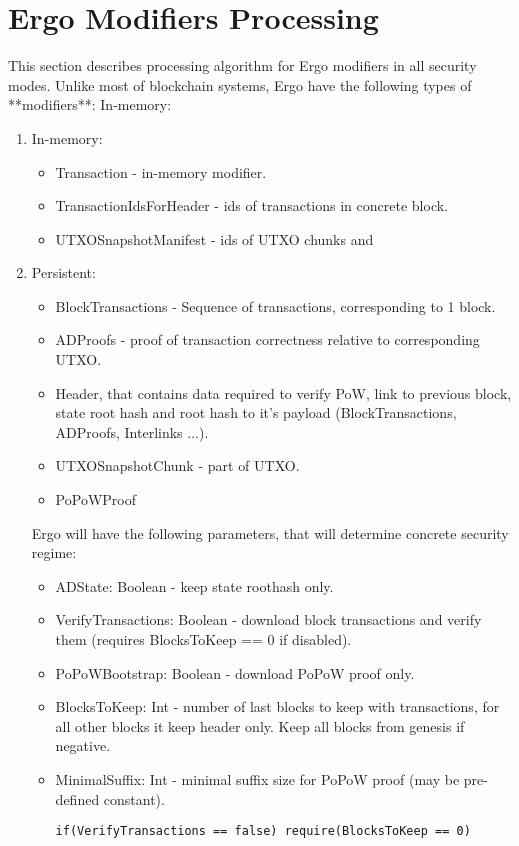 \documentclass[]{article}   %
\begin{document}
\section{Ergo Modifiers Processing}
This section describes processing algorithm for Ergo modifiers in all security modes. Unlike most of blockchain systems, Ergo have the following types of **modifiers**: In-memory:
\begin{enumerate}
\item In-memory:
\begin{itemize}
\item Transaction - in-memory modifier.
\item TransactionIdsForHeader - ids of transactions in concrete block.
\item UTXOSnapshotManifest - ids of UTXO chunks and
\end{itemize}
\item Persistent:
\begin{itemize}
\item BlockTransactions - Sequence of transactions, corresponding to 1 block.
\item ADProofs - proof of transaction correctness relative to corresponding UTXO.
\item Header, that contains data required to verify PoW, link to previous block, state root hash and root hash to it's payload (BlockTransactions, ADProofs, Interlinks ...).
\item UTXOSnapshotChunk - part of UTXO.
\item PoPoWProof
\end{itemize}
Ergo will have the following parameters, that will determine concrete security regime:
\begin{itemize}
\item ADState: Boolean - keep state roothash only.
\item VerifyTransactions: Boolean - download block transactions and verify them (requires BlocksToKeep == 0 if disabled).
\item PoPoWBootstrap: Boolean - download PoPoW proof only.
\item BlocksToKeep: Int - number of last blocks to keep with transactions, for all other blocks it keep header only. Keep all blocks from genesis if negative.
\item MinimalSuffix: Int - minimal suffix size for PoPoW proof (may be pre-defined constant).
\begin{verbatim}
if(VerifyTransactions == false) require(BlocksToKeep == 0)
\end{verbatim}

\end{itemize}
\end{enumerate}
\end{document}
